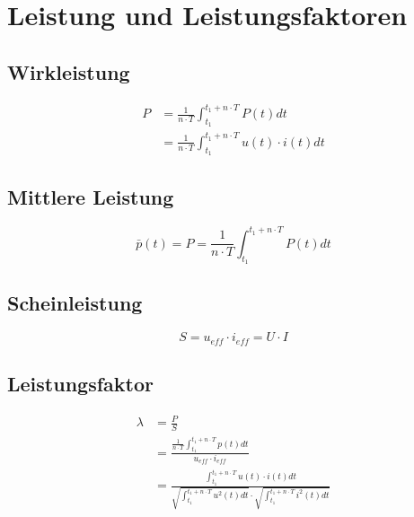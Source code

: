 \section{Leistung und Leistungsfaktoren}
\begin{multicols}{2}{}
 
\subsection{Wirkleistung}
\begin{align*}
P &= \frac{1}{n \cdot T} \int_{t_{1}}^{t_{1} + n \cdot T} P \left( t \right) dt \\
  &= \frac{1}{n \cdot T} \int_{t_{1}}^{t_{1} + n \cdot T} u \left( t \right) \cdot i \left( t \right) dt
\end{align*}

\subsection{Mittlere Leistung}
\[\bar{p} \left(t\right) = P = \frac{1}{n \cdot T} \int_{t_{1}}^{t_{1} + n \cdot T} P \left( t \right) dt\]

\subsection{Scheinleistung}
\[ S = u_{eff} \cdot i_{eff} = U \cdot I\]
\end{multicols}

\subsection{Leistungsfaktor}
\begin{align*}
\lambda &= \frac{P}{S} \\
	&= \frac{\frac{1}{n \cdot T} \int_{t_{1}}^{t_{1} + n \cdot T} p\left( t \right) dt}
	   { u_{eff} \cdot i_{eff}} \\
	&=  \frac{ \int_{t_{1}}^{t_{1} + n \cdot T} u \left( t \right) \cdot i \left( t \right) dt}
	   {\sqrt{ \int_{t_{1}}^{t_{1} + n \cdot T} u^2 \left( t \right) dt} \cdot
	    \sqrt{ \int_{t_{1}}^{t_{1} + n \cdot T} i^2 \left( t \right) dt}}
\end{align*}

\newpage
